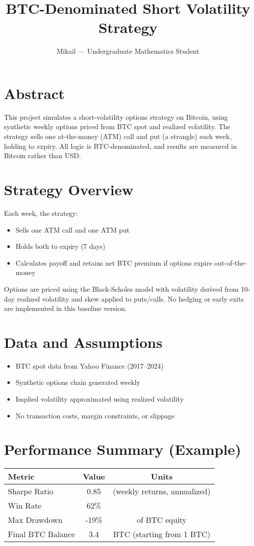 \documentclass[a4paper,10pt]{article}
\title{BTC-Denominated Short Volatility Strategy}
\author{Mikail — Undergraduate Mathematics Student}
\date{}
\begin{document}
\maketitle

\section*{Abstract}
This project simulates a short-volatility options strategy on Bitcoin, using synthetic weekly options priced from BTC spot and realized volatility. The strategy sells one at-the-money (ATM) call and put (a strangle) each week, holding to expiry. All logic is BTC-denominated, and results are measured in Bitcoin rather than USD.

\section*{Strategy Overview}
Each week, the strategy:
\begin{itemize}
  \item Sells one ATM call and one ATM put
  \item Holds both to expiry (7 days)
  \item Calculates payoff and retains net BTC premium if options expire out-of-the-money
\end{itemize}

Options are priced using the Black-Scholes model with volatility derived from 10-day realized volatility and skew applied to puts/calls. No hedging or early exits are implemented in this baseline version.

\section*{Data and Assumptions}
\begin{itemize}
  \item BTC spot data from Yahoo Finance (2017–2024)
  \item Synthetic options chain generated weekly
  \item Implied volatility approximated using realized volatility
  \item No transaction costs, margin constraints, or slippage
\end{itemize}

\section*{Performance Summary (Example)}
\begin{center}
\begin{tabular}{lcc}
\toprule
Metric & Value & Units \\
\midrule
Sharpe Ratio          & 0.85    & (weekly returns, annualized) \\
Win Rate              & 62\%    & \\
Max Drawdown          & -19\%   & of BTC equity \\
Final BTC Balance     & 3.4     & BTC (starting from 1 BTC) \\
\bottomrule
\end{tabular}
\end{center}
\end{document}
